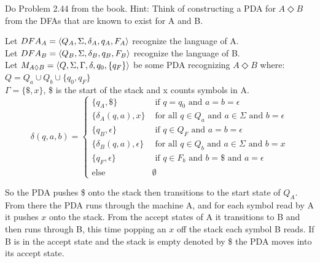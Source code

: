 \begin{problem}{9}
  Do Problem 2.44 from the book. Hint: Think of constructing a PDA for $A \Diamond B$ from the DFAs that are known to exist for A
  and B.
  \begin{solution}
    Let $DFA_A = \left \langle Q_A, \Sigma, \delta_A, q_A, F_A \right \rangle $ recognize the language of A. \\
    Let $DFA_B = \left \langle Q_B, \Sigma, \delta_B, q_B, F_B \right \rangle $ recognize the language of B. \\
    Let $M_{A \Diamond B} = \left \langle Q, \Sigma, \Gamma, \delta, q_0, \{ q_F \} \right \rangle $ be some PDA recognizing $A \Diamond B$ where:
    \br
    $Q = Q_a \cup Q_b \cup \{ q_0, q_F \}$ \\
    $\Gamma = \{ \$, x \}$, \$ is the start of the stack and x counts symbols in A.
    \br
    \[
      \delta(q, a, b) =
      \begin{cases}
        \{ q_A, \$ \} &\text{ if } q = q_0 \text{ and } a = b = \epsilon \\
        \{ \delta_A(q, a), x\} &\text{ for all } q \in Q_a \text{ and } a \in \Sigma \text{ and } b = \epsilon \\
        \{ q_B, \epsilon \} &\text{ if } q \in Q_F \text{ and } a = b = \epsilon \\
        \{ \delta_B(q, a), \epsilon \} &\text{ for all } q \in Q_b \text{ and } a \in \Sigma \text{ and } b = x \\
        \{ q_F, \epsilon \} &\text{ if } q \in F_b \text{ and } b = \$ \text{ and } a = \epsilon \\
        \text{else } &\emptyset
      \end{cases}
    \]

  \end{solution}
    So the PDA pushes \$ onto the stack then transitions to the start state of $Q_A$. From there the PDA runs through
    the machine A, and for each symbol read by A it pushes $x$ onto the stack. From the accept states of A it
    transitions to B and then runs through B, this time popping an $x$ off the stack each symbol B reads. If B is in the
    accept state and the stack is empty denoted by \$ the PDA moves into its accept state.
\end{problem}



